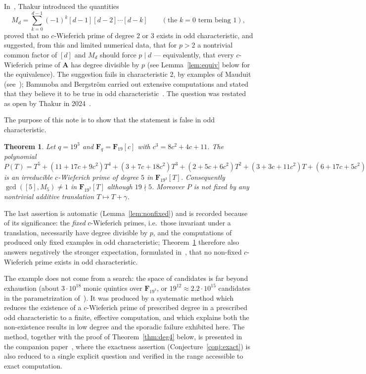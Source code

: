 \documentclass[11pt]{amsart}
\newcommand{\A}{\mathbf{A}}
\newcommand{\F}{\mathbf{F}}
\theoremstyle{plain}
\newtheorem{theorem}{Theorem}[section]
\theoremstyle{definition}
\begin{document}
In~\cite{Tha15}, Thakur introduced the quantities
\[
M_d=\sum_{k=0}^{d-1}(-1)^k[d-1][d-2]\cdots[d-k]\qquad(\text{the $k=0$ term being }1),
\]
proved that no $c$-Wieferich prime of degree $2$ or $3$ exists in odd
characteristic, and suggested, from this and limited numerical data, that for
$p>2$ a nontrivial common factor of $[d]$ and $M_d$ should force $p\mid d$ ---
equivalently, that every $c$-Wieferich prime of $\A$ has degree divisible by
$p$ (see Lemma~\ref{lem:equiv} below for the equivalence). The suggestion fails
in characteristic $2$, by examples of Mauduit (see~\cite{Tha15,BB});
Bamunoba and Bergstr\"om carried out extensive computations and stated that
they believe it to be true in odd characteristic~\cite{BB}. The question was
restated as open by Thakur in 2024~\cite{Tha24}.

The purpose of this note is to show that the statement is false in odd
characteristic.

\begin{theorem}\label{thm:main}
Let $q=19^3$ and $\F_q=\F_{19}[c]$ with $c^3=8c^2+4c+11$. The polynomial
\[
P(T)=T^5+(11+17c+9c^2)T^4+(3+7c+18c^2)T^3+(2+5c+6c^2)T^2+(3+3c+11c^2)T+(6+17c+5c^2)
\]
is an irreducible $c$-Wieferich prime of degree $5$ in $\F_{19^3}[T]$.
Consequently $\gcd([5],M_5)\neq1$ in $\F_{19^3}[T]$ although $19\nmid5$.
Moreover $P$ is not fixed by any nontrivial additive translation
$T\mapsto T+\gamma$.
\end{theorem}

The last assertion is automatic (Lemma~\ref{lem:nonfixed}) and is recorded
because of its significance: the \emph{fixed} $c$-Wieferich primes, i.e.\ those
invariant under a translation, necessarily have degree divisible by $p$, and
the computations of~\cite{BB} produced only fixed examples in odd
characteristic; Theorem~\ref{thm:main} therefore also answers negatively the
stronger expectation, formulated in~\cite{BB}, that no non-fixed $c$-Wieferich
prime exists in odd characteristic.

The example does not come from a search: the space of candidates is far beyond
exhaustion (about $3\cdot10^{18}$ monic quintics over $\F_{19^3}$, or
$19^{12}\approx2.2\cdot10^{15}$ candidates in the parametrization
of~\cite[Thm.~3.4]{BB}). It was produced by a systematic method which reduces
the existence of a $c$-Wieferich prime of prescribed degree in a prescribed odd
characteristic to a finite, effective computation, and which explains both the
non-existence results in low degree and the sporadic failure exhibited here.
The method, together with the proof of Theorem~\ref{thm:deg4} below, is
presented in the companion paper~\cite{NG2}, where the exactness assertion
(Conjecture~\ref{conj:exact}) is also reduced to a single explicit question and
verified in the range accessible to exact computation.
\end{document}
